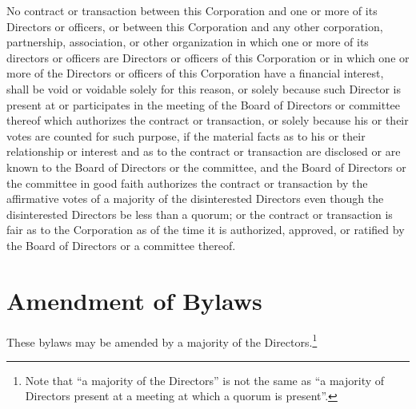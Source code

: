 No contract or transaction between this Corporation and one or more of its
Directors or officers, or between this Corporation and any other corporation,
partnership, association, or other organization in which one or more of its
directors or officers are Directors or officers of this Corporation or in which
one or more of the Directors or officers of this Corporation have a financial
interest, shall be void or voidable solely for this reason, or solely because
such Director is present at or participates in the meeting of the Board of
Directors or committee thereof which authorizes the contract or transaction, or
solely because his or their votes are counted for such purpose, if the material
facts as to his or their relationship or interest and as to the contract or
transaction are disclosed or are known to the Board of Directors or the
committee, and the Board of Directors or the committee in good faith authorizes
the contract or transaction by the affirmative votes of a majority of the
disinterested Directors even though the disinterested Directors be less than a
quorum; or the contract or transaction is fair as to the Corporation as of the
time it is authorized, approved, or ratified by the Board of Directors or a
committee thereof.

\section{Amendment of Bylaws}

These bylaws may be amended by a majority of the Directors.\footnote{Note that
``a majority of the Directors'' is not the same as ``a majority of Directors
present at a meeting at which a quorum is present''.}
